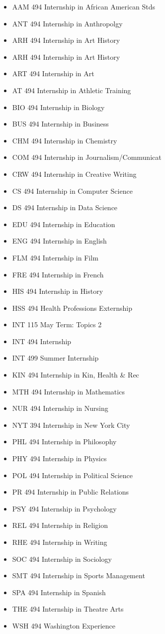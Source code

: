 \documentclass[
  letterpaper,
]{scrbook}
\providecommand{\tightlist}{%
  \setlength{\itemsep}{0pt}\setlength{\parskip}{0pt}}
\begin{document}
\begin{itemize}
\tightlist
\item
  AAM 494 Internship in African American Stds
\item
  ANT 494 Internship in Anthropolgy
\item
  ARH 494 Internship in Art History
\item
  ARH 494 Internship in Art History
\item
  ART 494 Internship in Art
\item
  AT 494 Internship in Athletic Training
\item
  BIO 494 Internship in Biology
\item
  BUS 494 Internship in Business
\item
  CHM 494 Internship in Chemistry
\item
  COM 494 Internship in Journalism/Communicat
\item
  CRW 494 Internship in Creative Writing
\item
  CS 494 Internship in Computer Science
\item
  DS 494 Internship in Data Science
\item
  EDU 494 Internship in Education
\item
  ENG 494 Internship in English
\item
  FLM 494 Internship in Film
\item
  FRE 494 Internship in French
\item
  HIS 494 Internship in History
\item
  HSS 494 Health Professions Externship
\item
  INT 115 May Term: Topics 2
\item
  INT 494 Internship
\item
  INT 499 Summer Internship
\item
  KIN 494 Internship in Kin, Health \& Rec
\item
  MTH 494 Internship in Mathematics
\item
  NUR 494 Internship in Nursing
\item
  NYT 394 Internship in New York City
\item
  PHL 494 Internship in Philosophy
\item
  PHY 494 Internship in Physics
\item
  POL 494 Internship in Political Science
\item
  PR 494 Internship in Public Relations
\item
  PSY 494 Internship in Psychology
\item
  REL 494 Internship in Religion
\item
  RHE 494 Internship in Writing
\item
  SOC 494 Internship in Sociology
\item
  SMT 494 Internship in Sports Management
\item
  SPA 494 Internship in Spanish
\item
  THE 494 Internship in Theatre Arts
\item
  WSH 494 Washington Experience
\end{itemize}
\end{document}
